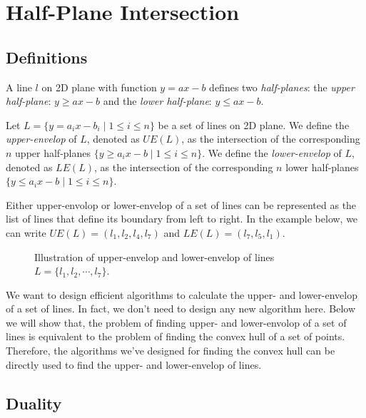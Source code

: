 \section{Half-Plane Intersection}

\subsection*{Definitions}

\begin{definition}
A line $l$ on 2D plane with function $y = ax - b$ defines two \emph{half-planes}:
the \emph{upper half-plane}: $y \ge ax -b$ and the \emph{lower half-plane}: $y \le ax -b$.
\end{definition}

\begin{definition}
Let $L = \{y = a_i x - b_i \mid 1 \le i \le n \}$ be a set of lines on 2D plane.
We define the \emph{upper-envelop} of $L$, denoted as $UE(L)$, as the intersection of
the corresponding $n$ upper half-planes $\{y \ge a_i x -b \mid 1 \le i \le n \}$.
We define the \emph{lower-envelop} of $L$, denoted as $LE(L)$, as the intersection of
the corresponding $n$ lower half-planes $\{y \le a_i x -b \mid 1 \le i \le n \}$.
\end{definition}

Either upper-envolop or lower-envelop of a set of lines can be represented
as the list of lines that define its boundary from left to right. In the example
below, we can write $UE(L) = (l_1, l_2, l_4, l_7)$
and $LE(L) = (l_7, l_5, l_1)$.

\begin{figure}[h!]
\centering{}
\caption{Illustration of upper-envelop and lower-envelop of lines $L = \{l_1, l_2, \cdots, l_7\}$.}
\end{figure}

We want to design efficient algorithms to calculate the upper- and lower-envelop of a set of lines.
In fact, we don't need to design any new algorithm here. Below we will show that, the problem of finding
upper- and lower-envolop of a set of lines is equivalent to the problem of finding the convex hull
of a set of points. Therefore, the algorithms we've designed for finding the convex hull can be
directly used to find the upper- and lower-envelop of lines.


\subsection*{Duality}

